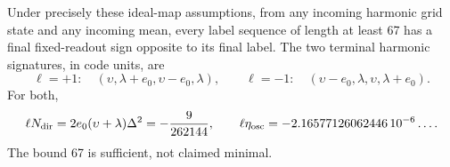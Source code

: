 \begin{theorem}\label{thm:eighth}
Under precisely these ideal-map assumptions, from any incoming harmonic grid state and any incoming mean, every label sequence of length at least 67 has a final fixed-readout sign opposite to its final label. The two terminal harmonic signatures, in code units, are
\begin{equation}\label{eq:signature}
 \ell=+1:\quad(\upsilon,\lambda+e_0,\upsilon-e_0,\lambda),
 \qquad
 \ell=-1:\quad(\upsilon-e_0,\lambda,\upsilon,\lambda+e_0).
\end{equation}
For both,
\begin{equation}\label{eq:wrongmargin}
 \ell N_{\rm dir}=2e_0(\upsilon+\lambda)\Delta^2
       =-\frac9{262144},\qquad
 \ell\eta_{\rm osc}=-2.16577126062446\,10^{-6}\ldots .
\end{equation}
The bound 67 is sufficient, not claimed minimal.
\end{theorem}
